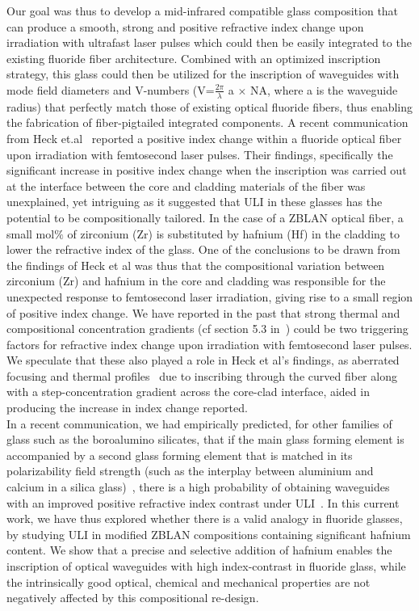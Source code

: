 \documentclass[11pt]{article}
\begin{document}
Our goal was thus to develop a mid-infrared compatible glass composition that can produce a smooth, strong and positive refractive index change upon irradiation with ultrafast laser pulses which could then be easily integrated to the existing fluoride fiber architecture. Combined with an optimized inscription strategy, this glass could then be utilized for the inscription of waveguides with mode field diameters and V-numbers (V=$\frac{2\pi}{\lambda}$ a $\times$ NA, where a is the waveguide radius) that perfectly match those of existing optical fluoride fibers, thus enabling the fabrication of fiber-pigtailed integrated components. A recent communication from Heck et.al~\cite{Heck18} reported a positive index change within a fluoride optical fiber upon irradiation with femtosecond laser pulses. Their findings, specifically the significant increase in positive index change when the inscription was carried out at the interface between the core and cladding materials of the fiber was unexplained, yet intriguing as it suggested that ULI in these glasses has the potential to be compositionally tailored. In the case of a ZBLAN optical fiber, a small mol$\%$ of zirconium (Zr) is substituted by hafnium (Hf) in the cladding to lower the refractive index of the glass.  One of the conclusions to be drawn from the findings of Heck et al was thus that the compositional variation between zirconium (Zr) and hafnium in the core and cladding was responsible for the unexpected response to femtosecond laser irradiation, giving rise to a small region of positive index change.  We have reported in the past that strong thermal and compositional concentration gradients (cf section 5.3 in~\cite{Fernandez2018}) could be two triggering factors for refractive index change upon irradiation with femtosecond laser pulses. We speculate that these also played a role in Heck et al’s findings, as aberrated focusing and thermal profiles~\cite{Fernandez_2015} due to inscribing through the curved fiber along with a step-concentration gradient across the core-clad interface, aided in producing the increase in index change reported.
\\In a recent communication, we had empirically predicted, for other families of glass such as the boroalumino silicates, that if the main glass forming element is accompanied by a second glass forming element that is matched in its polarizability field strength (such as the interplay between aluminium and calcium in a silica glass)~\cite{Fernandez2020}, there is a high probability of obtaining waveguides with an improved positive refractive index contrast under ULI~\cite{Fernandez2020}.  In this current work, we have thus explored whether there is a valid analogy in fluoride glasses, by studying ULI in modified ZBLAN compositions containing significant hafnium content. We show that a precise and selective addition of hafnium enables the inscription of optical waveguides with high index-contrast in fluoride glass, while the intrinsically good optical, chemical and mechanical properties are not negatively affected by this compositional re-design.
\end{document}
